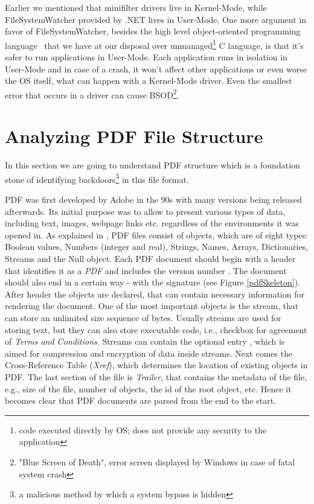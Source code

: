 Earlier we mentioned that minifilter drivers live in Kernel-Mode, while FileSystemWatcher provided by .NET lives in User-Mode. One more argument in favor of FileSystemWatcher, besides the high level object-oriented programming language \CSharp\ that we have at our disposal over unmanaged\footnote{code executed directly by OS; does not provide any security to the application} C language, is that it's safer to run applications in User-Mode. Each application runs in isolation in User-Mode and in case of a crash, it won't affect other applications or even worse the OS itself, what can happen with a Kernel-Mode driver. Even the smallest error that occurs in a driver can cause BSOD\footnote{"Blue Screen of Death", error screen displayed by Windows in case of fatal system crash}. 

\newpage
\section{Analyzing PDF File Structure}
\label{section:pdfStructure}
In this section we are going to understand PDF structure which is a foundation stone of identifying backdoors\footnote{a malicious method by which a system bypass is hidden} in this file format. \par
PDF was first developed by Adobe in the 90s with many versions being released afterwards. Its initial purpose was to allow to present various types of data, including text, images, webpage links etc. regardless of the environments it was opened in. As explained in \cite{pdfReference}, PDF files consist of objects, which are of eight types: Boolean values, Numbers (integer and real), Strings, Names, Arrays, Dictionaries, Streams and the Null object. Each PDF document should begin with a header that identifies it as a \textit{PDF} and includes the version number . The document should also end in a certain way - with the signature  (see Figure \ref{pdfSkeleton}). After header the objects are declared, that can contain necessary information for rendering the document. One of the most important objects is the stream, that can store an unlimited size sequence of bytes. Usually streams are used for storing text, but they can also store executable code, i.e., checkbox for agreement of \textit{Terms and Conditions}. Streams can contain the optional entry , which is aimed for compression and encryption of data inside streams. Next comes the Cross-Reference Table (\textit{Xref}), which 
determines the location of existing objects in PDF. The last section of the file is \textit{Trailer}, that contains the metadata of the file, e.g., size of the file, number of objects, the id of the root object, etc. Hence it becomes clear that PDF documents are parsed from the end to the start.

